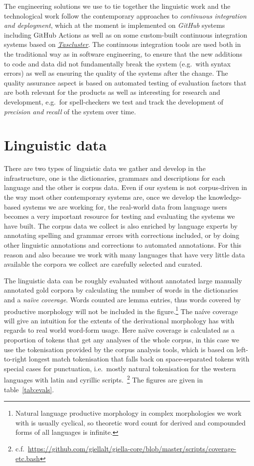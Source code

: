 \documentclass[free]{flammie}
\begin{document}
The engineering solutions we use to tie together the linguistic work and the
technological work follow the contemporary approaches to \textit{continuous
integration and deployment}, which at the moment is implemented on
\textit{GitHub} systems including GitHub Actions as well as on some custom-built
continuous integration systems based on
\textit{\href{https://taskcluster.net}{Tascluster}}.  The continuous integration
tools are used both in the traditional way as in software engineering, to ensure
that the new additions to code and data did not fundamentally break the system
(e.g.\ with syntax errors) as well as ensuring the quality of the systems after
the change.  The quality assurance aspect is based on automated testing of
evaluation factors that are both relevant for the products as well as
interesting for research and development, e.g.\ for spell-checkers we test and
track the development of \textit{precision and recall} of the system over time.


\section{Linguistic data}

There are two types of linguistic data we gather and develop in the
infrastructure, one is the dictionaries, grammars and descriptions for each
language and the other is corpus data.  Even if our system is not corpus-driven
in the way most other contemporary systems are, once we develop the
knowledge-based systems we are working for, the real-world data from language
users becomes a very important resource for testing and evaluating the systems
we have built.  The corpus data we collect is also enriched by language experts
by annotating spelling and grammar errors with corrections included, or by doing
other linguistic annotations and corrections to automated annotations.  For this
reason and also because we work with many languages that have very little data
available the corpora we collect are carefully selected and curated.

The linguistic data can be roughly evaluated without annotated large manually
annotated gold corpora by calculating the number of words in the dictionaries
and a \textit{naïve coverage}.  Words counted are lemma entries, thus words
covered by productive morphology will not be included in the
figure.\footnote{Natural language productive morphology in complex morphologies
we work with is usually cyclical, so theoretic word count for derived and
compounded forms of all languages is infinite.} The naíve coverage will give an
intuition for the extents of the derivational morphology has with regards to
real world word-form usage.  Here naïve coverage is calculated as a proportion
of tokens that get any analyses of the whole corpus, in this case we use the
tokenisation provided by the corpus analysis tools, which is based on
left-to-right longest match tokenisation that falls back on space-separated
tokens with special cases for punctuation, i.e.\ mostly natural tokenisation for
the western languages with latin and cyrillic
scripts.~\footnote{c.f.\
\url{https://github.com/giellalt/giella-core/blob/master/scripts/coverage-etc.bash}}
The figures are given in table~\ref{tab:evals}.
\end{document}
